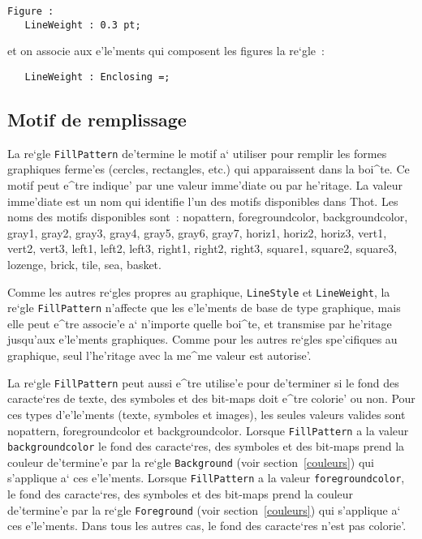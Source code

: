 {\begin{example}
\begin{verbatim}
Figure :
   LineWeight : 0.3 pt;
\end{verbatim}
et on associe aux e'le'ments qui composent les figures la re`gle~:
\begin{verbatim}
   LineWeight : Enclosing =;
\end{verbatim}
\end{example}

\subsection{Motif de remplissage}
\label{remplissage}

La re`gle {\tt FillPattern} de'termine le motif a` utiliser pour remplir
les formes graphiques ferme'es (cercles, rectangles, etc.) qui apparaissent
dans la boi^te. Ce motif peut e^tre indique' par une valeur imme'diate ou
par he'ritage. La valeur imme'diate est un nom qui identifie l'un des motifs
disponibles dans Thot. Les noms des motifs disponibles sont~:
nopattern, foregroundcolor, backgroundcolor, gray1, gray2, gray3, gray4, gray5, gray6,
gray7, horiz1, horiz2, horiz3, vert1, vert2, vert3, left1, left2, left3,
right1, right2, right3, square1, square2, square3, lozenge, brick, tile, sea,
basket.

Comme les autres re`gles propres au graphique, {\tt LineStyle} et
{\tt LineWeight}, la re`gle {\tt FillPattern} n'affecte que les e'le'ments
de base de type graphique, mais elle peut e^tre associe'e a` n'importe quelle
boi^te, et transmise par he'ritage jusqu'aux e'le'ments graphiques.
Comme pour les autres re`gles spe'cifiques au graphique, seul l'he'ritage
avec la me^me valeur est autorise'.

La re`gle {\tt FillPattern} peut aussi e^tre utilise'e pour de'terminer
si le fond des caracte`res de texte, des symboles et des bit-maps doit e^tre
colorie' ou non. Pour ces types d'e'le'ments (texte, symboles et images),
les seules valeurs valides sont nopattern, foregroundcolor et
backgroundcolor. Lorsque {\tt FillPattern} a la valeur {\tt backgroundcolor}
le fond des caracte`res, des symboles et des bit-maps prend la couleur
de'termine'e par la re`gle {\tt Background} (voir section~\ref{couleurs}) qui
s'applique a` ces e'le'ments. Lorsque {\tt FillPattern} a la valeur
{\tt foregroundcolor}, le fond des caracte`res, des symboles et des bit-maps
prend la couleur de'termine'e par la re`gle {\tt Foreground} (voir
section~\ref{couleurs}) qui s'applique a` ces e'le'ments. Dans tous les autres
cas, le fond des caracte`res n'est pas colorie'.

}
